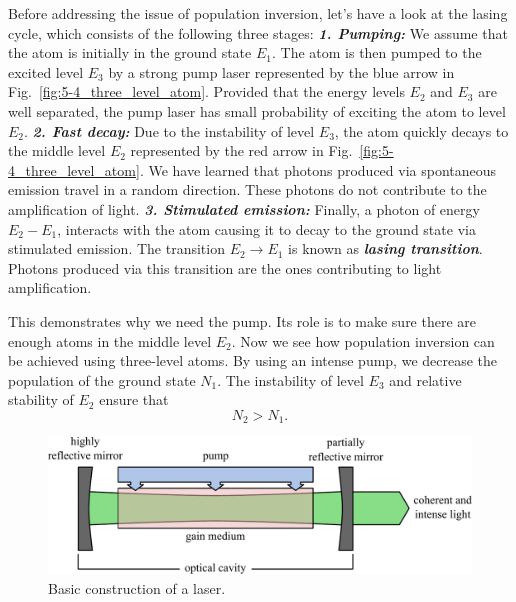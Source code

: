 Before addressing the issue of population inversion, let's have a look at the lasing cycle, which consists of the following three stages:
\newline
\textit{\textbf{1. Pumping:}}
We assume that the atom is initially in the ground state $E_1$.
The atom is then pumped to the excited level $E_3$ by a strong pump laser represented by the blue arrow in Fig.~\ref{fig:5-4_three_level_atom}.
Provided that the energy levels $E_2$ and $E_3$ are well separated, the pump laser has small probability of exciting the atom to level $E_2$.
\newline
\textit{\textbf{2. Fast decay:}}
Due to the instability of level $E_3$, the atom quickly decays to the middle level $E_2$ represented by the red arrow in Fig.~\ref{fig:5-4_three_level_atom}.
We have learned that photons produced via spontaneous emission travel in a random direction.
These photons do not contribute to the amplification of light.
\newline
\textit{\textbf{3. Stimulated emission:}}
Finally, a photon of energy $E_2-E_1$, interacts with the atom causing it to decay to the ground state via stimulated emission.
The transition $E_2\rightarrow E_1$ is known as \textit{\textbf{lasing transition}}.
Photons produced via this transition are the ones contributing to light amplification.

This demonstrates why we need the pump.
Its role is to make sure there are enough atoms in the middle level $E_2$.
Now we see how population inversion can be achieved using three-level atoms.
By using an intense pump, we decrease the population of the ground state $N_1$.
The instability of level $E_3$ and relative stability of $E_2$ ensure that
\begin{equation}
    N_2 > N_1.
\end{equation}

\begin{figure}[t]
    \centering
    \includegraphics[width=\textwidth]{lesson5/5-4_laser construction.pdf}
    \caption[Laser construction]{Basic construction of a laser.}
    \label{fig:5-4_laser_construction}
\end{figure}

